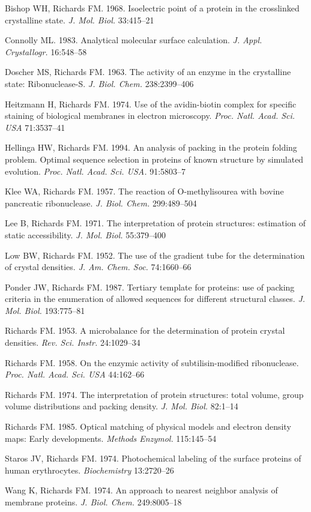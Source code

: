 \documentclass{ar2e}
\begin{document}
\begin{thebibliography}{99}
Bishop WH, Richards FM. 1968. Isoelectric point of a protein in 
the crosslinked crystalline state. {\it J. Mol. Biol.} 33:415--21

Connolly ML. 1983. Analytical molecular surface calculation. {\it J. 
Appl. Crystallogr.} 16:548--58

Doscher MS, Richards FM. 1963. The activity of an enzyme in the 
crystalline state: Ribonuclease-S. {\it J. Biol. Chem.} 238:2399--406

Heitzmann H, Richards FM. 1974. Use of the avidin-biotin 
complex for specific staining of biological membranes in 
electron microscopy. {\it Proc. Natl. Acad. Sci. USA} 71:3537--41


Hellinga HW, Richards FM. 1994. An analysis of packing in the 
protein folding problem. Optimal sequence selection in 
proteins of known structure by simulated evolution. {\it Proc. 
Natl. Acad. Sci. USA.} 91:5803--7


Klee WA, Richards FM. 1957. The reaction of O-methylisourea 
with bovine pancreatic ribonuclease. {\it J. Biol. Chem.} 299:489--504


Lee B, Richards FM. 1971. The interpretation of protein 
structures: estimation of static accessibility. {\it J. Mol. Biol.}
55:379--400


Low BW, Richards FM. 1952. The use of the gradient tube for 
the determination of crystal densities. 
{\it J. Am. Chem. Soc.} 74:1660--66


Ponder JW, Richards FM. 1987. Tertiary template for proteins: 
use of packing criteria in the enumeration of allowed 
sequences for different structural classes. {\it J. Mol. Biol.} 
193:775--81


Richards FM. 1953. A microbalance for the determination of 
protein crystal densities. {\it Rev. Sci. Instr.} 24:1029--34


Richards FM. 1958. 
On the enzymic activity of subtilisin-modified ribonuclease. 
{\it Proc. Natl. Acad. Sci. USA} 44:162--66


Richards FM. 1974. The interpretation of protein structures: 
total volume, group volume distributions and packing density. 
{\it J. Mol. Biol.} 82:1--14


Richards FM. 1985. Optical matching of physical models and 
electron density maps: Early developments. {\it Methods  
Enzymol.} 115:145--54


Staros JV, Richards FM. 1974. Photochemical labeling of the 
surface proteins of human erythrocytes. {\it Biochemistry} 13:2720--26


Wang K, Richards FM. 1974. An approach to nearest neighbor 
analysis of membrane proteins. {\it J. Biol. Chem.} 249:8005--18
\end{thebibliography}
\end{document}
